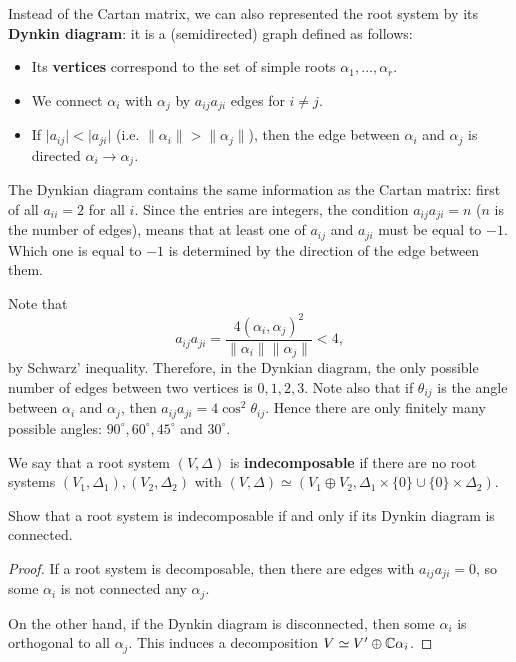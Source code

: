\documentclass[11pt, english]{article}
\begin{document}
Instead of the Cartan matrix, we can also represented the root system by its \textbf{Dynkin diagram}: it is a (semidirected) graph defined as follows:

\begin{itemize}
\item Its \textbf{vertices} correspond to the set of simple roots $\alpha_1,\ldots,\alpha_r$. 
\item We connect $\alpha_i$ with $\alpha_j$ by $a_{ij}a_{ji}$ edges for $i \neq j$. 
\item If $\lvert a_{ij} \rvert < \lvert a_{ji} \rvert$ (i.e. $\| \alpha_i  \| > \| \alpha_j \|$), then the edge between $\alpha_i$ and $\alpha_j$ is directed $\alpha_i \to \alpha_j$.
\end{itemize}

The Dynkian diagram contains the same information as the Cartan matrix: first of all $a_{ii}=2$ for all $i$. Since the entries are integers, the condition $a_{ij}a_{ji}=n$ ($n$ is the number of edges), means that at least one of $a_{ij}$ and $a_{ji}$ must be equal to $-1$. Which one is equal to $-1$ is determined by the direction of the edge between them.

\begin{remark}
  Note that 
$$
a_{ij} a_{ji} = \frac{4 (\alpha_i,\alpha_j)^2}{\| \alpha_i \| \| \alpha_j \|} < 4,
$$
by Schwarz' inequality. Therefore, in the Dynkian diagram, the only possible number of edges between two vertices is $0,1,2,3$. Note also that if $\theta_{ij}$ is the angle between $\alpha_i$ and $\alpha_j$, then $a_{ij}a_{ji}=4 \cos^2 \theta_{ij}$. Hence there are only finitely many possible angles: $90^\circ, 60^\circ, 45^\circ$ and $30^\circ$.
\end{remark}


We say that a root system $(V,\Delta)$ is \textbf{indecomposable} if there are no root systems $(V_1,\Delta_1), (V_2, \Delta_2)$ with $(V, \Delta) \simeq (V_1 \oplus V_2, \Delta_1 \times \{ 0\} \cup \{0 \} \times \Delta_2)$.

\begin{lemma}
 Show that a root system is indecomposable if and only if its Dynkin diagram is connected.
\end{lemma}
\begin{proof}
If a root system is decomposable, then there are edges with $a_{ij}a_{ji}=0$, so some $\alpha_i$ is not connected any $\alpha_j$.

On the other hand, if the Dynkin diagram is disconnected, then some $\alpha_i$ is orthogonal to all $\alpha_j$. This induces a decomposition $V \simeq V' \oplus \mathbb{C} \alpha_i$. 
\end{proof}
\end{document}
